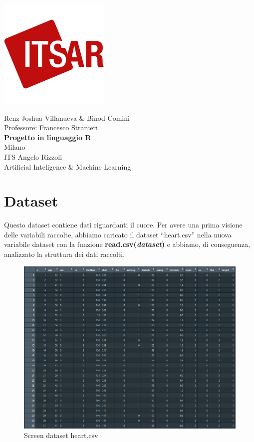 \documentclass{article}
\begin{document}
\begin{center}
	\includegraphics[scale=0.4]{itsar}
\end{center}

\begin{center}
	\vspace{14ex}
	Renz Joshua Villanueva \& Binod Comini\\	
	Professore: Francesco Stranieri\\
	\vspace{10ex}
	\textbf{{
			\large Progetto in linguaggio R
	}}\\
	\vspace{16ex}
	{\large 
		Milano\\
		ITS Angelo Rizzoli\\
		Artificial Inteligence \& Machine Learning
	}
\end{center}

\newpage

\tableofcontents
\newpage

\section{Dataset}
Questo dataset contiene dati riguardanti il cuore.
Per avere una prima visione delle variabili raccolte, abbiamo caricato il dataset “heart.csv” nella nuova variabile dataset con la funzione \textbf{read.csv(\textit{dataset})} e abbiamo, di conseguenza, analizzato la struttura dei dati raccolti. \\
\begin{figure}[h]
	\centering
	\includegraphics[width=1\textwidth]{raw-heart.png}
	\caption{Screen dataset heart.csv}
	\label {fig:ds1}
\end{figure}
\end{document}
